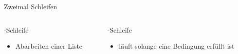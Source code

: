 \documentclass[aspectratio=43]{beamer}
\begin{document}
\begin{frame}{Zweimal Schleifen}
  \begin{columns}
    \begin{column}{0.5\textwidth}
      \begin{block}{-Schleife}
        \begin{itemize}
          \item Abarbeiten einer Liste
        \end{itemize}
      \end{block}
    \end{column}
    \begin{column}{0.6\textwidth}
       \begin{block}{-Schleife}
            \begin{itemize}
              \item läuft solange eine Bedingung erfüllt ist
            \end{itemize}
        \end{block}
    \end{column}
  \end{columns}
\end{frame}

% 
\end{document}
